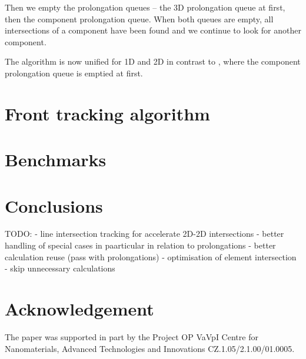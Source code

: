 \documentclass{elsarticle}
\begin{document}
Then we empty the prolongation queues -- the 3D prolongation queue at first, then the component prolongation queue.
When both queues are empty, all intersections of a component have been found and we continue to look for
another component.

The algorithm is now unified for 1D and 2D in contrast to \cite{fris_dp_2015}, where the component prolongation
queue is emptied at first.


\section{Front tracking algorithm}
\section{Benchmarks}

\section{Conclusions}
TODO:
- line intersection tracking for accelerate 2D-2D intersections
- better handling of special cases in paarticular in relation to prolongations
- better calculation reuse (pass with prolongations)
- optimisation of element intersection - skip unnecessary calculations
\section{Acknowledgement}
The paper was supported in part by the Project OP
VaVpI Centre for Nanomaterials, Advanced Technologies  and Innovations
CZ.1.05/2.1.00/01.0005.






% 
% 
% 
  
 
\end{document}
